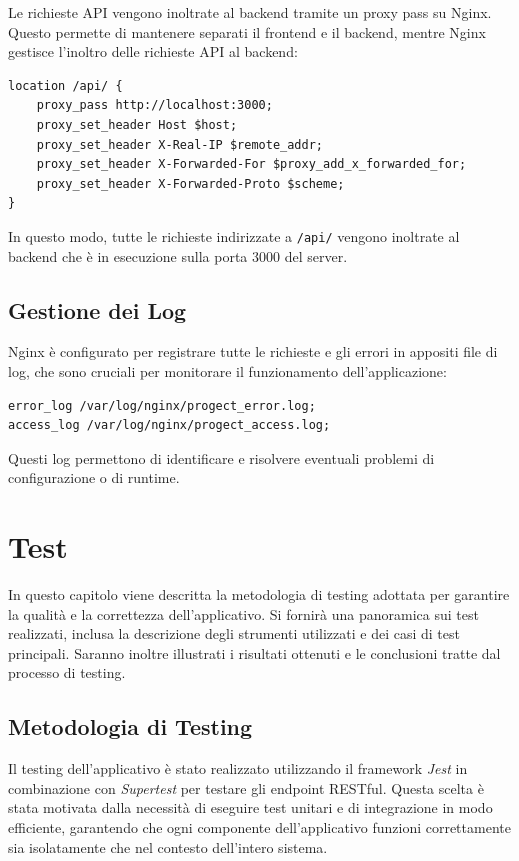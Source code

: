 \documentclass[twoside]{supsistudent}
\begin{document}
Le richieste API vengono inoltrate al backend tramite un proxy pass su Nginx. Questo permette di mantenere separati il frontend e il backend, mentre Nginx gestisce l'inoltro delle richieste API al backend:

\begin{verbatim}
location /api/ {
    proxy_pass http://localhost:3000;
    proxy_set_header Host $host;
    proxy_set_header X-Real-IP $remote_addr;
    proxy_set_header X-Forwarded-For $proxy_add_x_forwarded_for;
    proxy_set_header X-Forwarded-Proto $scheme;
}
\end{verbatim}

In questo modo, tutte le richieste indirizzate a \texttt{/api/} vengono inoltrate al backend che è in esecuzione sulla porta 3000 del server.

\section{Gestione dei Log}

Nginx è configurato per registrare tutte le richieste e gli errori in appositi file di log, che sono cruciali per monitorare il funzionamento dell'applicazione:

\begin{verbatim}
error_log /var/log/nginx/progect_error.log;
access_log /var/log/nginx/progect_access.log;
\end{verbatim}

Questi log permettono di identificare e risolvere eventuali problemi di configurazione o di runtime.

\chapter{Test}

In questo capitolo viene descritta la metodologia di testing adottata per garantire la qualità e la correttezza dell'applicativo. Si fornirà una panoramica sui test realizzati, inclusa la descrizione degli strumenti utilizzati e dei casi di test principali. Saranno inoltre illustrati i risultati ottenuti e le conclusioni tratte dal processo di testing.

\section{Metodologia di Testing}

Il testing dell'applicativo è stato realizzato utilizzando il framework \textit{Jest} in combinazione con \textit{Supertest} per testare gli endpoint RESTful. Questa scelta è stata motivata dalla necessità di eseguire test unitari e di integrazione in modo efficiente, garantendo che ogni componente dell'applicativo funzioni correttamente sia isolatamente che nel contesto dell'intero sistema.
\end{document}
